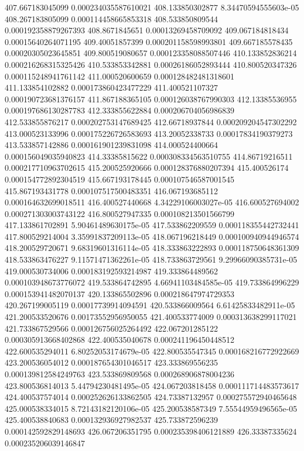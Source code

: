 {407.667183045099 0.000234035587610021
408.133850302877 8.34470594555603e-05
408.267183805099 0.000114458665853318
408.533850809544 0.000192358879267393
408.8671845651 0.00013269458709092
409.067184818434 0.00015640264071195
409.40051857399 0.000201158598993801
409.667185578435 0.00020305023645851
409.800519080657 0.000123358088507446
410.133852836214 0.000216268315325426
410.533853342881 0.00026186052893444
410.800520347326 0.000115248941761142
411.000520600659 0.000128482481318601
411.133854102882 0.000173860423477229
411.400521107327 0.000190723681376157
411.867188365105 0.000126038767990303
412.13385536955 0.000197686130287783
412.333855622884 0.000206704056986839
412.533855876217 0.000202753147689425
412.66718937844 0.000209204547302292
413.000523133996 0.000175226726583693
413.20052338733 0.00017834190379273
413.533857142886 0.000161901239831098
414.000524400664 0.000156049035940823
414.33385815622 0.000308334563510755
414.86719216511 0.000217710963702615
415.200525920666 0.000128376880207394
415.400526174 0.000154772892304519
415.667193178445 0.000107546587001545
415.867193431778 0.000107517500483351
416.067193685112 0.000164632699018511
416.400527440668 4.34229106003027e-05
416.600527694002 0.000271303003743122
416.800527947335 0.000108213501566799
417.133861702891 5.90461489630175e-05
417.533862209559 0.000118355442732441
417.800529214004 3.35991837209113e-05
418.067196218449 0.000100940944946574
418.200529720671 9.68319601316114e-05
418.333863222893 0.000118750648361309
418.533863476227 9.11571471362261e-05
418.733863729561 9.29966090385731e-05
419.000530734006 0.000183192593214987
419.333864489562 0.000103948673776072
419.533864742895 4.66941103484585e-05
419.733864996229 0.000153941482070137
420.133865502896 0.000218647974729353
420.267199005119 0.00017739914094591
420.533866009564 6.61425833482911e-05
421.200533520676 0.00173552956950055
421.400533774009 0.000313638299117021
421.733867529566 0.000126756025264492
422.067201285122 0.000305913668402868
422.400535040678 0.000241196450448512
422.600535294011 6.80252053174679e-05
422.800535547345 0.000168216772922669
423.200536054012 0.000187654301046517
423.333869556235 0.000139812584249763
423.533869809568 0.000268906878004236
423.800536814013 5.44794230481495e-05
424.067203818458 0.000111714483573617
424.400537574014 0.000252626133862505
424.73387132957 0.000275572940465648
425.000538334015 8.72143182120106e-05
425.200538587349 7.55544959496565e-05
425.400538840683 0.000132936927982537
425.733872596239 0.000142592829148693
426.067206351795 0.000235398406121889
426.33387335624 0.000235206039146847
}
